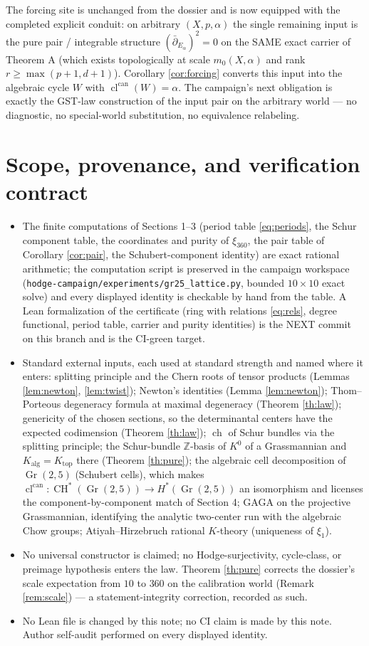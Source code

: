 \documentclass[11pt]{article}
\theoremstyle{definition}
\newcommand{\ch}{\operatorname{ch}}
\newcommand{\cl}{\operatorname{cl}^{\operatorname{can}}}
\newcommand{\ddbar}{\bar\partial}
\begin{document}
The forcing site is unchanged from the dossier and is now equipped
with the completed explicit conduit: on arbitrary $(X,p,\alpha)$ the
single remaining input is the pure pair / integrable structure
$(\ddbar_{E_\alpha})^2=0$ on the SAME exact carrier of Theorem A
(which exists topologically at scale $m_0(X,\alpha)$ and rank
$r\ge\max(p+1,d+1)$). Corollary \ref{cor:forcing} converts this input
into the algebraic cycle $W$ with $\cl(W)=\alpha$. The campaign's
next obligation is exactly the GST-law construction of the input pair
on the arbitrary world --- no diagnostic, no special-world
substitution, no equivalence relabeling.

\section{Scope, provenance, and verification contract}
\begin{itemize}
\item The finite computations of Sections 1--3 (period table
\eqref{eq:periods}, the Schur component table, the coordinates and
purity of $\xi_{360}$, the pair table of Corollary \ref{cor:pair},
the Schubert-component identity) are exact rational arithmetic; the
computation script is preserved in the campaign workspace
(\texttt{hodge-campaign/experiments/gr25\_lattice.py}, bounded
$10\times10$ exact solve) and every displayed identity is checkable
by hand from the table. A Lean formalization of the certificate
(ring with relations \eqref{eq:rels}, degree functional, period
table, carrier and purity identities) is the NEXT commit on this
branch and is the CI-green target.
\item Standard external inputs, each used at standard strength and
named where it enters: splitting principle and the Chern roots of
tensor products (Lemmas \ref{lem:newton}, \ref{lem:twist}); Newton's
identities (Lemma \ref{lem:newton}); Thom--Porteous degeneracy
formula at maximal degeneracy (Theorem \ref{th:law}); genericity of
the chosen sections, so the determinantal centers have the expected
codimension (Theorem \ref{th:law}); $\ch$ of Schur bundles via the
splitting principle; the Schur-bundle
$\mathbb Z$-basis of $K^0$ of a Grassmannian and $K_{\mathrm{alg}}=
K_{\mathrm{top}}$ there (Theorem \ref{th:pure}); the algebraic cell
decomposition of $\operatorname{Gr}(2,5)$ (Schubert cells), which
makes $\cl\colon\operatorname{CH}^*(\operatorname{Gr}(2,5))\to
H^*(\operatorname{Gr}(2,5))$ an isomorphism and licenses the
component-by-component match of Section 4; GAGA on the projective
Grassmannian, identifying the analytic two-center run with the
algebraic Chow groups; Atiyah--Hirzebruch
rational $K$-theory (uniqueness of $\xi_1$).
\item No universal constructor is claimed; no Hodge-surjectivity,
cycle-class, or preimage hypothesis enters the law. Theorem
\ref{th:pure} corrects the dossier's scale expectation from $10$ to
$360$ on the calibration world (Remark \ref{rem:scale}) --- a
statement-integrity correction, recorded as such.
\item No Lean file is changed by this note; no CI claim is made by
this note. Author self-audit performed on every displayed identity.
\end{itemize}
\end{document}

